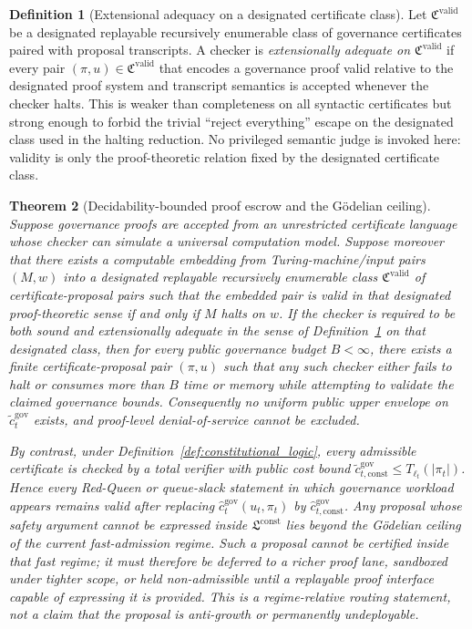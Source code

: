 \documentclass[11pt]{article}
\newtheorem{theorem}{Theorem}[section]
\theoremstyle{definition}
\newtheorem{definition}[theorem]{Definition}
\newcommand{\1}{\mathbf{1}}
\begin{document}
\begin{definition}[Extensional adequacy on a designated certificate class]\label{def:adequacy}
Let $\mathfrak C^{\mathrm{valid}}$ be a designated replayable recursively enumerable class of governance certificates paired with proposal transcripts. A checker is \emph{extensionally adequate on $\mathfrak C^{\mathrm{valid}}$} if every pair $(\pi,u)\in \mathfrak C^{\mathrm{valid}}$ that encodes a governance proof valid relative to the designated proof system and transcript semantics is accepted whenever the checker halts. This is weaker than completeness on all syntactic certificates but strong enough to forbid the trivial ``reject everything'' escape on the designated class used in the halting reduction. No privileged semantic judge is invoked here: validity is only the proof-theoretic relation fixed by the designated certificate class.
\end{definition}

\begin{theorem}[Decidability-bounded proof escrow and the G\"odelian ceiling]\label{thm:godelian_ceiling}
Suppose governance proofs are accepted from an unrestricted certificate language whose checker can simulate a universal computation model. Suppose moreover that there exists a computable embedding from Turing-machine/input pairs $(M,w)$ into a designated replayable recursively enumerable class $\mathfrak C^{\mathrm{valid}}$ of certificate-proposal pairs such that the embedded pair is valid in that designated proof-theoretic sense if and only if $M$ halts on $w$. If the checker is required to be both sound and extensionally adequate in the sense of Definition~\ref{def:adequacy} on that designated class, then for every public governance budget $B<\infty$, there exists a finite certificate-proposal pair $(\pi,u)$ such that any such checker either fails to halt or consumes more than $B$ time or memory while attempting to validate the claimed governance bounds. Consequently no uniform public upper envelope on $\widetilde c_t^{\mathrm{gov}}$ exists, and proof-level denial-of-service cannot be excluded.

By contrast, under Definition~\ref{def:constitutional_logic}, every admissible certificate is checked by a total verifier with public cost bound $\widetilde c_{t,\mathrm{const}}^{\mathrm{gov}}\le T_{\ell_t}(|\pi_t|)$. Hence every Red-Queen or queue-slack statement in which governance workload appears remains valid after replacing $\widehat c_t^{\mathrm{gov}}(u_t,\pi_t)$ by $\widehat c_{t,\mathrm{const}}^{\mathrm{gov}}$. Any proposal whose safety argument cannot be expressed inside $\mathfrak L^{\mathrm{const}}$ lies beyond the \emph{G\"odelian ceiling} of the current fast-admission regime. Such a proposal cannot be certified \emph{inside that fast regime}; it must therefore be deferred to a richer proof lane, sandboxed under tighter scope, or held non-admissible until a replayable proof interface capable of expressing it is provided. This is a regime-relative routing statement, not a claim that the proposal is anti-growth or permanently undeployable.
\end{theorem}
\end{document}
